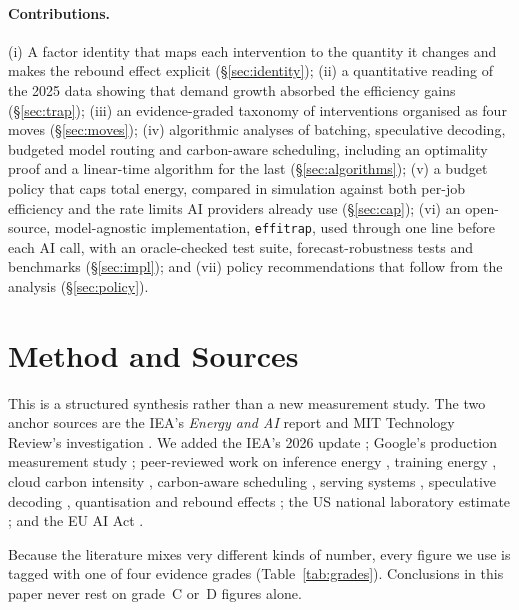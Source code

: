 \documentclass[11pt]{article}
\theoremstyle{definition}
\theoremstyle{remark}
\begin{document}
\paragraph{Contributions.} (i) A factor identity that maps each intervention to the quantity it changes and makes the rebound effect explicit (\S\ref{sec:identity}); (ii) a quantitative reading of the 2025 data showing that demand growth absorbed the efficiency gains (\S\ref{sec:trap}); (iii) an evidence-graded taxonomy of interventions organised as four moves (\S\ref{sec:moves}); (iv) algorithmic analyses of batching, speculative decoding, budgeted model routing and carbon-aware scheduling, including an optimality proof and a linear-time algorithm for the last (\S\ref{sec:algorithms}); (v) a budget policy that caps total energy, compared in simulation against both per-job efficiency and the rate limits AI providers already use (\S\ref{sec:cap}); (vi) an open-source, model-agnostic implementation, \texttt{effitrap}, used through one line before each AI call, with an oracle-checked test suite, forecast-robustness tests and benchmarks (\S\ref{sec:impl}); and (vii) policy recommendations that follow from the analysis (\S\ref{sec:policy}).

\section{Method and Sources}\label{sec:method}

This is a structured synthesis rather than a new measurement study. The two anchor sources are the IEA's \emph{Energy and AI} report \citep{iea2025} and MIT Technology Review's investigation \citep{mittr2025}. We added the IEA's 2026 update \citep{iea2026}; Google's production measurement study \citep{elsworth2025}; peer-reviewed work on inference energy \citep{luccioni2024power}, training energy \citep{patterson2022}, cloud carbon intensity \citep{dodge2022}, carbon-aware scheduling \citep{radovanovic2023}, serving systems \citep{kwon2023}, speculative decoding \citep{leviathan2023}, quantisation \citep{dettmers2022} and rebound effects \citep{luccioni2025jevons}; the US national laboratory estimate \citep{shehabi2024}; and the EU AI Act \citep{euaiact}.

Because the literature mixes very different kinds of number, every figure we use is tagged with one of four evidence grades (Table~\ref{tab:grades}). Conclusions in this paper never rest on grade~C or~D figures alone.
\end{document}
